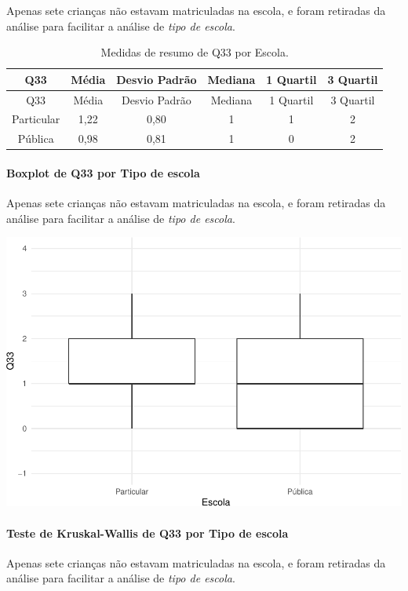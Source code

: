 \documentclass[]{article}
\let\oldparagraph\paragraph
\renewcommand{\paragraph}[1]{\oldparagraph{#1}\mbox{}}
\begin{document}
Apenas sete crianças não estavam matriculadas na escola, e foram retiradas da análise para facilitar a análise de \emph{tipo de escola}.

\begin{longtable}[]{@{}cccccc@{}}
\caption{\label{tab:unnamed-chunk-1178}Medidas de resumo de Q33 por Escola.}\tabularnewline
\toprule
Q33 & Média & Desvio Padrão & Mediana & 1 Quartil & 3 Quartil\tabularnewline
\midrule
\endfirsthead
\toprule
Q33 & Média & Desvio Padrão & Mediana & 1 Quartil & 3 Quartil\tabularnewline
\midrule
\endhead
Particular & 1,22 & 0,80 & 1 & 1 & 2\tabularnewline
Pública & 0,98 & 0,81 & 1 & 0 & 2\tabularnewline
\bottomrule
\end{longtable}

\hypertarget{boxplot-de-q33-por-tipo-de-escola}{%
\paragraph{Boxplot de Q33 por Tipo de escola}\label{boxplot-de-q33-por-tipo-de-escola}}

Apenas sete crianças não estavam matriculadas na escola, e foram retiradas da análise para facilitar a análise de \emph{tipo de escola}.

\begin{center}\includegraphics[width=0.75\linewidth]{relatorio_covid19_files/figure-latex/unnamed-chunk-1179-1} \end{center}

\hypertarget{teste-de-kruskal-wallis-de-q33-por-tipo-de-escola}{%
\paragraph{Teste de Kruskal-Wallis de Q33 por Tipo de escola}\label{teste-de-kruskal-wallis-de-q33-por-tipo-de-escola}}

Apenas sete crianças não estavam matriculadas na escola, e foram retiradas da análise para facilitar a análise de \emph{tipo de escola}.
\end{document}
